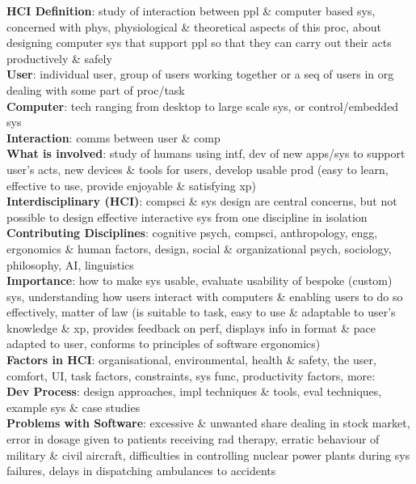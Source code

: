 \documentclass[a4paper]{article}
\begin{document}
    \tiny
    \begin{multicols}{3}
        \noindent\textbf{HCI Definition}: study of interaction between ppl \& computer based sys, concerned with phys, physiological \& theoretical aspects of this proc, about designing computer sys that support ppl so that they can carry out their acts productively \& safely\\
        \textbf{User}: individual user, group of users working together or a seq of users in org dealing with some part of proc/task\\
        \textbf{Computer}: tech ranging from desktop to large scale sys, or control/embedded sys\\
        \textbf{Interaction}: comms between user \& comp\\
        \textbf{What is involved}: study of humans using intf, dev of new apps/sys to support user's acts, new devices \& tools for users, develop usable prod (easy to learn, effective to use, provide enjoyable \& satisfying xp)\\
        \textbf{Interdisciplinary (HCI)}: compsci \& sys design are central concerns, but not possible to design effective interactive sys from one discipline in isolation\\
        \textbf{Contributing Disciplines}: cognitive psych, compsci, anthropology, engg, ergonomics \& human factors, design, social \& organizational psych, sociology, philosophy, AI, linguistics\\
        \textbf{Importance}: how to make sys usable, evaluate usability of bespoke (custom) sys, understanding how users interact with computers \& enabling users to do so effectively, matter of law (is suitable to task, easy to use \& adaptable to user's knowledge \& xp, provides feedback on perf, displays info in format \& pace adapted to user, conforms to principles of software ergonomics)\\
        \textbf{Factors in HCI}: organisational, environmental, health \& safety, the user, comfort, UI, task factors, constraints, sys func, productivity factors, more:\\
        \textbf{Dev Process}: design approaches, impl techniques \& tools, eval techniques, example sys \& case studies\\
        \textbf{Problems with Software}: excessive \& unwanted share dealing in stock market, error in dosage given to patients receiving rad therapy, erratic behaviour of military \& civil aircraft, difficulties in controlling nuclear power plants during sys failures, delays in dispatching ambulances to accidents\\

\end{multicols}
\end{document}
